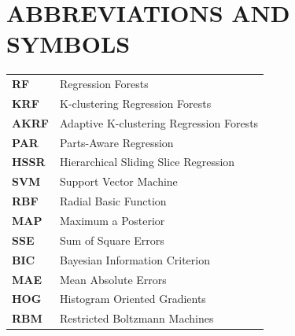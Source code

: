 \documentclass{tutmscthesis}[2010/09/22]
\numberwithin{equation}{section}
\numberwithin{table}{section}
\numberwithin{figure}{section}
\begin{document}
\section*{ABBREVIATIONS AND SYMBOLS}\label{sec:sym}
\begin{tabular}{l l}
\textbf{RF} & Regression Forests\\
\textbf{KRF} & K-clustering Regression Forests\\
\textbf{AKRF} & Adaptive K-clustering Regression Forests\\
\textbf{PAR} & Parts-Aware Regression\\
\textbf{HSSR} & Hierarchical Sliding Slice Regression\\
\textbf{SVM} & Support Vector Machine\\
\textbf{RBF} & Radial Basic Function\\
\textbf{MAP} & Maximum a Posterior\\
\textbf{SSE} & Sum of Square Errors\\
\textbf{BIC} & Bayesian Information Criterion\\
\textbf{MAE} & Mean Absolute Errors\\
\textbf{HOG} & Histogram Oriented Gradients\\
\textbf{RBM} & Restricted Boltzmann Machines\\
\end{tabular}
\end{document}
